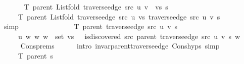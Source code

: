 \begin{isabellebody}
\ \ \isamarkupfalse%
\isanewline
\ \ \ \ {\isachardoublequoteopen}T\ {\isacharparenleft}{\kern0pt}parent\ {\isacharparenleft}{\kern0pt}List{\isachardot}{\kern0pt}fold\ {\isacharparenleft}{\kern0pt}traverse{\isacharunderscore}{\kern0pt}edge\ src\ u{\isacharparenright}{\kern0pt}\ {\isacharparenleft}{\kern0pt}v\ {\isacharhash}{\kern0pt}\ vs{\isacharparenright}{\kern0pt}\ s{\isacharparenright}{\kern0pt}{\isacharparenright}{\kern0pt}\ {\isacharequal}{\kern0pt}\isanewline
\ \ \ \ \ T\ {\isacharparenleft}{\kern0pt}parent\ {\isacharparenleft}{\kern0pt}List{\isachardot}{\kern0pt}fold\ {\isacharparenleft}{\kern0pt}traverse{\isacharunderscore}{\kern0pt}edge\ src\ u{\isacharparenright}{\kern0pt}\ vs\ {\isacharparenleft}{\kern0pt}traverse{\isacharunderscore}{\kern0pt}edge\ src\ u\ v\ s{\isacharparenright}{\kern0pt}{\isacharparenright}{\kern0pt}{\isacharparenright}{\kern0pt}{\isachardoublequoteclose}\isanewline
\ \ \ \ \isamarkupfalse%
\ simp\isanewline
\ \ \isamarkupfalse%
\ \isamarkupfalse%
\isanewline
\ \ \ \ {\isachardoublequoteopen}{\isachardot}{\kern0pt}{\isachardot}{\kern0pt}{\isachardot}{\kern0pt}\ {\isacharequal}{\kern0pt}\isanewline
\ \ \ \ \ T\ {\isacharparenleft}{\kern0pt}parent\ {\isacharparenleft}{\kern0pt}traverse{\isacharunderscore}{\kern0pt}edge\ src\ u\ v\ s{\isacharparenright}{\kern0pt}{\isacharparenright}{\kern0pt}\ {\isasymunion}\isanewline
\ \ \ \ \ {\isacharbraceleft}{\kern0pt}{\isacharparenleft}{\kern0pt}u{\isacharcomma}{\kern0pt}\ w{\isacharparenright}{\kern0pt}\ {\isacharbar}{\kern0pt}w{\isachardot}{\kern0pt}\ w\ {\isasymin}\ set\ vs\ {\isasymand}\ {\isasymnot}\ is{\isacharunderscore}{\kern0pt}discovered\ src\ {\isacharparenleft}{\kern0pt}parent\ {\isacharparenleft}{\kern0pt}traverse{\isacharunderscore}{\kern0pt}edge\ src\ u\ v\ s{\isacharparenright}{\kern0pt}{\isacharparenright}{\kern0pt}\ w{\isacharbraceright}{\kern0pt}{\isachardoublequoteclose}\isanewline
\ \ \ \ \isamarkupfalse%
\ Cons{\isachardot}{\kern0pt}prems\isanewline
\ \ \ \ \isamarkupfalse%
\ {\isacharparenleft}{\kern0pt}intro\ invar{\isacharunderscore}{\kern0pt}parent{\isacharunderscore}{\kern0pt}traverse{\isacharunderscore}{\kern0pt}edge\ Cons{\isachardot}{\kern0pt}hyps{\isacharparenright}{\kern0pt}\ simp{\isacharplus}{\kern0pt}\isanewline
\ \ \isamarkupfalse%
\ \isamarkupfalse%
\isanewline
\ \ \ \ {\isachardoublequoteopen}{\isachardot}{\kern0pt}{\isachardot}{\kern0pt}{\isachardot}{\kern0pt}\ {\isacharequal}{\kern0pt}\isanewline
\ \ \ \ \ T\ {\isacharparenleft}{\kern0pt}parent\ s{\isacharparenright}{\kern0pt}\ {\isasymunion}\isanewline

\end{isabellebody}
